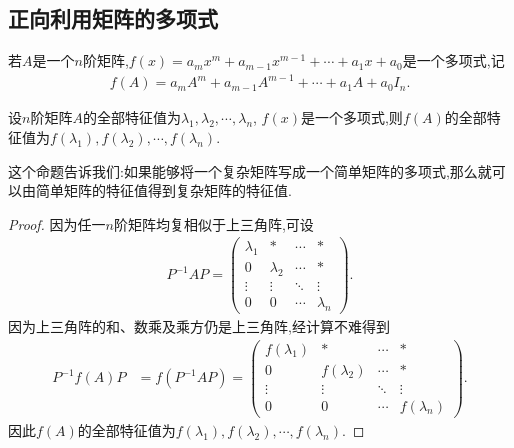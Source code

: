 \documentclass[../../main.tex]{subfiles}
\begin{document}
\subsection{正向利用矩阵的多项式}

\begin{definition}[矩阵多项式]
若$A$是一个$n$阶矩阵,$f(x) = a_m x^m + a_{m-1} x^{m-1} + \cdots + a_1 x + a_0$是一个多项式,记
\begin{align*}
f(A) = a_m A^m + a_{m-1} A^{m-1} + \cdots + a_1 A + a_0 I_n.
\end{align*}
\end{definition}

\begin{proposition}\label{proposition:矩阵多项式的特征值就是原特征值代入多项式得到的数}
设$n$阶矩阵$A$的全部特征值为$\lambda_1, \lambda_2, \cdots, \lambda_n$, $f(x)$是一个多项式,则$f(A)$的全部特征值为$f(\lambda_1), f(\lambda_2), \cdots, f(\lambda_n)$.
\end{proposition}
\begin{remark}
这个命题告诉我们:如果能够将一个复杂矩阵写成一个简单矩阵的多项式,那么就可以由简单矩阵的特征值得到复杂矩阵的特征值.
\end{remark}
\begin{proof}
因为任一$n$阶矩阵均复相似于上三角阵,可设
\begin{align*}
P^{-1}AP = \begin{pmatrix}
\lambda_1 & * & \cdots & * \\
0 & \lambda_2 & \cdots & * \\
\vdots & \vdots & \ddots & \vdots \\
0 & 0 & \cdots & \lambda_n
\end{pmatrix}.
\end{align*}
因为上三角阵的和、数乘及乘方仍是上三角阵,经计算不难得到
\begin{align*}
P^{-1}f(A)P &= f(P^{-1}AP) = \begin{pmatrix}
f(\lambda_1) & * & \cdots & * \\
0 & f(\lambda_2) & \cdots & * \\
\vdots & \vdots & \ddots & \vdots \\
0 & 0 & \cdots & f(\lambda_n)
\end{pmatrix}.
\end{align*}
因此$f(A)$的全部特征值为$f(\lambda_1), f(\lambda_2), \cdots, f(\lambda_n)$.

\end{proof}
\end{document}
